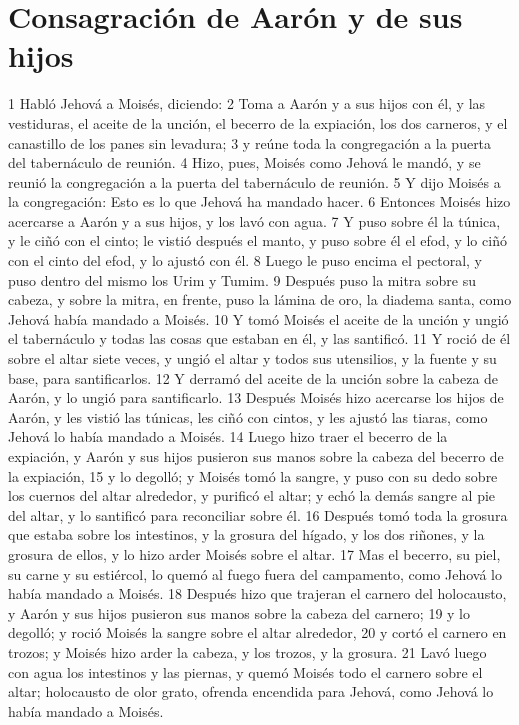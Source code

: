 \section*{Consagración de Aarón y de sus hijos}

1 Habló Jehová a Moisés, diciendo:
2 Toma a Aarón y a sus hijos con él, y las vestiduras, el aceite de la unción, el becerro de la expiación, los dos carneros, y el canastillo de los panes sin levadura;
3 y reúne toda la congregación a la puerta del tabernáculo de reunión.
4 Hizo, pues, Moisés como Jehová le mandó, y se reunió la congregación a la puerta del tabernáculo de reunión.
5 Y dijo Moisés a la congregación: Esto es lo que Jehová ha mandado hacer.
6 Entonces Moisés hizo acercarse a Aarón y a sus hijos, y los lavó con agua.
7 Y puso sobre él la túnica, y le ciñó con el cinto; le vistió después el manto, y puso sobre él el efod, y lo ciñó con el cinto del efod, y lo ajustó con él.
8 Luego le puso encima el pectoral, y puso dentro del mismo los Urim y Tumim.
9 Después puso la mitra sobre su cabeza, y sobre la mitra, en frente, puso la lámina de oro, la diadema santa, como Jehová había mandado a Moisés.
10 Y tomó Moisés el aceite de la unción y ungió el tabernáculo y todas las cosas que estaban en él, y las santificó.
11 Y roció de él sobre el altar siete veces, y ungió el altar y todos sus utensilios, y la fuente y su base, para santificarlos.
12 Y derramó del aceite de la unción sobre la cabeza de Aarón, y lo ungió para santificarlo.
13 Después Moisés hizo acercarse los hijos de Aarón, y les vistió las túnicas, les ciñó con cintos, y les ajustó las tiaras, como Jehová lo había mandado a Moisés.
14 Luego hizo traer el becerro de la expiación, y Aarón y sus hijos pusieron sus manos sobre la cabeza del becerro de la expiación,
15 y lo degolló; y Moisés tomó la sangre, y puso con su dedo sobre los cuernos del altar alrededor, y purificó el altar; y echó la demás sangre al pie del altar, y lo santificó para reconciliar sobre él.
16 Después tomó toda la grosura que estaba sobre los intestinos, y la grosura del hígado, y los dos riñones, y la grosura de ellos, y lo hizo arder Moisés sobre el altar.
17 Mas el becerro, su piel, su carne y su estiércol, lo quemó al fuego fuera del campamento, como Jehová lo había mandado a Moisés.
18 Después hizo que trajeran el carnero del holocausto, y Aarón y sus hijos pusieron sus manos sobre la cabeza del carnero;
19 y lo degolló; y roció Moisés la sangre sobre el altar alrededor,
20 y cortó el carnero en trozos; y Moisés hizo arder la cabeza, y los trozos, y la grosura.
21 Lavó luego con agua los intestinos y las piernas, y quemó Moisés todo el carnero sobre el altar; holocausto de olor grato, ofrenda encendida para Jehová, como Jehová lo había mandado a Moisés.
